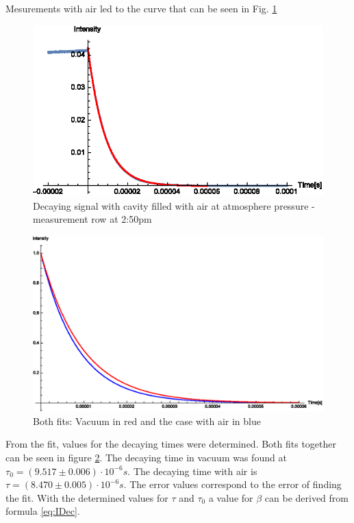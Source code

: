 \documentclass[
	parskip=half,10pt,
	numbers= noenddot, %
	toc=flat, %
	oneside,
	twocolumn,
	]{scrartcl}
\begin{document}
Mesurements with air led to the curve that can be seen in Fig. \ref{fig:air}

\begin{figure}[hb]
\includegraphics[width=\textwidth/2]{images/air.eps}
\caption{Decaying signal with cavity filled with air at atmosphere pressure - measurement row at 2:50pm}
\label{fig:air}
\end{figure}
\begin{figure}
\includegraphics[width=\textwidth/2]{images/airvacuum.eps}
\caption{Both fits: Vacuum in red and the case with air in blue }
\label{fig:airvacuum}
\end{figure}

From the fit, values for the decaying times were determined. Both fits together can be seen in figure \ref{fig:airvacuum}.
The decaying time in vacuum was found at $\tau_0=(9.517\pm0.006)\cdot 10^{-6}s$. The decaying time with 
air is $\tau=(8.470\pm0.005)\cdot 10^{-6}s$. The error values correspond to the error of finding the fit. 
With the determined values for $\tau$ and $\tau_0$ a value for $\beta$ can be derived from formula \ref{eq:IDec}.
\end{document}
